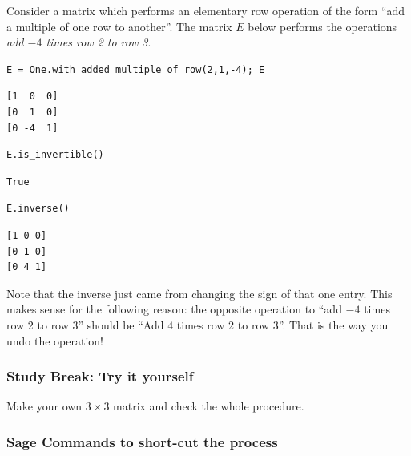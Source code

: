 \documentclass[10pt,]{book}
\theoremstyle{plain}
\numberwithin{equation}{section}
\begin{document}
      Consider a matrix which performs an elementary row operation of the
      form ``add a multiple of one row to another''. The matrix \(E\)
      below performs the operations \emph{add \(-4\) times row 2 to row 3}.
\begin{lstlisting}[style=sageinput]
E = One.with_added_multiple_of_row(2,1,-4); E
\end{lstlisting}
\begin{lstlisting}[style=sageoutput]
[1  0  0]
[0  1  0]
[0 -4  1]
\end{lstlisting}
\begin{lstlisting}[style=sageinput]
E.is_invertible()
\end{lstlisting}
\begin{lstlisting}[style=sageoutput]
True
\end{lstlisting}
\begin{lstlisting}[style=sageinput]
E.inverse()
\end{lstlisting}
\begin{lstlisting}[style=sageoutput]
[1 0 0]
[0 1 0]
[0 4 1]
\end{lstlisting}
\par

      Note that the inverse just came from changing the sign of that one entry.
      This makes sense for the following reason: the opposite operation to
      ``add \(-4\) times row 2 to row 3'' should be ``Add \(4\) times
      row 2 to row 3''. That is the way you undo the operation!
\typeout{************************************************}
\typeout{************************************************}
\subsubsection[Study Break: Try it yourself]{Study Break: Try it yourself}\label{subsubsection-25}

        Make your own \(3\times 3\) matrix and check the whole procedure.
\typeout{************************************************}
\typeout{************************************************}
\subsubsection[Sage Commands to short-cut the process]{Sage Commands to short-cut the process}\label{subsubsection-26}
\end{document}
